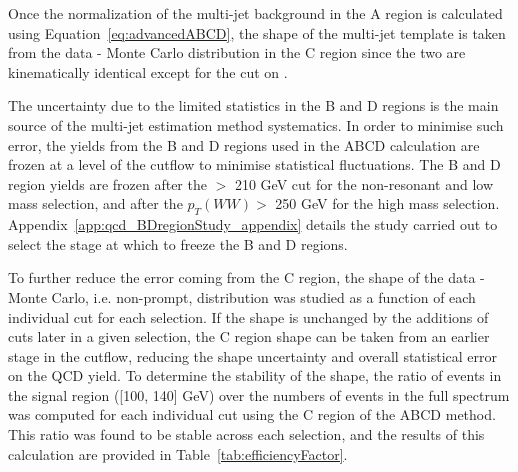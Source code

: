 Once the normalization of the multi-jet background in the A region is calculated using Equation~\ref{eq:advancedABCD}, the shape of the multi-jet template is taken from the data - Monte Carlo distribution in the C region since the two are kinematically identical except for the cut on \dsig.

The uncertainty due to the limited statistics in the B and D regions is the
main source of the multi-jet estimation method systematics. In order to minimise
such error,  the yields from the  B and D regions used in the ABCD
calculation are frozen at a level of the cutflow to minimise statistical fluctuations.
The B and D region yields are frozen after the \ptbb $>$ 210 GeV cut for the non-resonant and low mass selection, and after the $p_{T}(WW)>$ 250 GeV for the high mass selection. Appendix~\ref{app:qcd_BDregionStudy_appendix} details the study carried out to select the stage at which to freeze the B and D regions. 

To further reduce the error coming from the C region, the shape of the data - Monte Carlo, i.e. non-prompt, 
\mbb distribution was studied as a function of each individual cut for each selection. If the \mbb shape is 
unchanged by the additions of cuts later in a given selection, the C region shape can be taken from an 
earlier stage in the cutflow, reducing the shape uncertainty and overall statistical error on the QCD yield.
To determine the stability of the \mbb shape, the ratio of events in the \mbb signal region ([100, 140] GeV)
over the numbers of events in the full \mbb spectrum was computed for each individual cut using the C region 
of the ABCD method. This ratio was found to be stable across each selection, and the results of this 
calculation are provided in Table~\ref{tab:efficiencyFactor}. 

